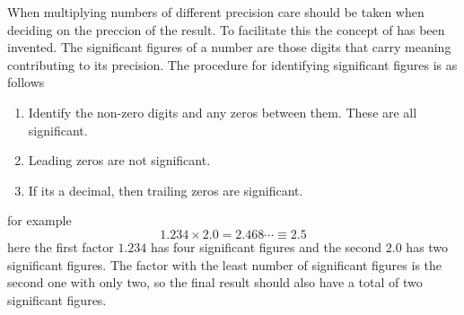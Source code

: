 When multiplying numbers of different precision care should be taken when deciding on the preccion of the result. To facilitate this the concept of  has been invented. The significant figures of a number are those digits that carry meaning contributing to its precision. The procedure for identifying significant figures is as follows 
\begin{enumerate}
\item Identify the non-zero digits and any zeros between them. These are all significant.
\item Leading zeros are not significant.
\item If its a decimal, then trailing zeros are significant.
\end{enumerate}
for example
\[
1.234 \times 2.0 = 2.468\cdots \equiv 2.5
\]
here the first factor $1.234$ has four significant figures and the second $2.0$ has two significant figures. The factor with the least number of significant figures is the second one with only two, so the final result should also have a total of two significant figures.




